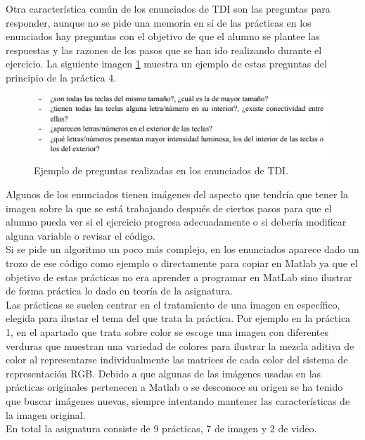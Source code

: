 Otra característica común de los enunciados de TDI son las preguntas para responder, aunque no se pide una memoria en sí de las prácticas en los enunciados hay preguntas con el objetivo de que el alumno se plantee las respuestas y las razones de los pasos que se han ido realizando durante el ejercicio.  La siguiente imagen \ref{preguntasp4} muestra un ejemplo de estas preguntas del principio de la práctica 4.

\begin{figure}[h]
\centering
\includegraphics[width=1\textwidth]{imagenes/preguntasp4}
\caption{Ejemplo de preguntas realizadas en los enunciados de TDI.}
\label{preguntasp4}
\end{figure}

Algunos de los enunciados tienen imágenes del aspecto que tendría que tener la imagen sobre la que se está trabajando después de ciertos pasos para que el alumno pueda ver si el ejercicio progresa adecuadamente o si debería modificar alguna variable o revisar el código.\\

Si se pide un algoritmo un poco más complejo, en los enunciados aparece dado un trozo de ese código como ejemplo o directamente para copiar en Matlab ya que el objetivo de estas prácticas no era aprender a programar en MatLab sino ilustrar de forma práctica lo dado en teoría de la asignatura.\\

Las prácticas se suelen centrar en el tratamiento de una imagen en específico, elegida para ilustar el tema del que trata la práctica. Por ejemplo en la práctica 1, en el apartado que trata sobre color se escoge una imagen con diferentes verduras que muestran una variedad de colores para ilustrar la mezcla aditiva de color al representarse individualmente las matrices de cada color del sistema de representación RGB. Debido a que algunas de las imágenes usadas en las prácticas originales pertenecen a Matlab o se desconoce su origen se ha tenido que buscar imágenes nuevas, siempre intentando mantener las características de la imagen original.\\

En total la asignatura consiste de 9 prácticas, 7 de imagen y 2 de video. \\

